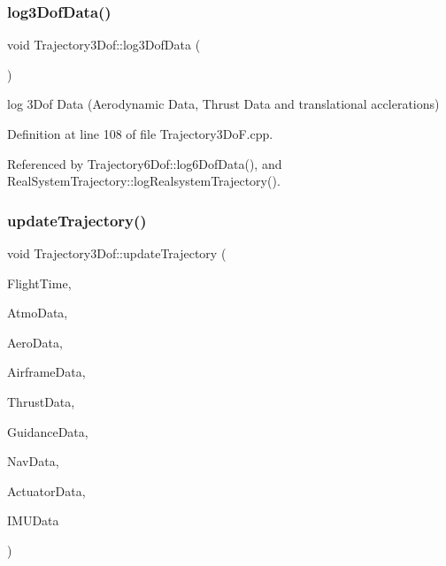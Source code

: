 \mbox{\label{class_trajectory3_dof_a0ec1ae76ec1d60f03aaef9107b749cd0}} 
\subsubsection{\texorpdfstring{log3\+Dof\+Data()}{log3DofData()}}
{\footnotesize\ttfamily void Trajectory3\+Dof\+::log3\+Dof\+Data (\begin{DoxyParamCaption}{ }\end{DoxyParamCaption})}



log 3\+Dof Data (Aerodynamic Data, Thrust Data and translational acclerations) 



Definition at line 108 of file Trajectory3\+Do\+F.\+cpp.



Referenced by Trajectory6\+Dof\+::log6\+Dof\+Data(), and Real\+System\+Trajectory\+::log\+Realsystem\+Trajectory().

\mbox{\label{class_trajectory3_dof_a286d578ad75beaf1018350167557a457}} 
\subsubsection{\texorpdfstring{update\+Trajectory()}{updateTrajectory()}}
{\footnotesize\ttfamily void Trajectory3\+Dof\+::update\+Trajectory (\begin{DoxyParamCaption}\item[{\hyperlink{group___tools_ga3f1431cb9f76da10f59246d1d743dc2c}{Float64}}]{Flight\+Time,  }\item[{Atmosphere\+Struct \&}]{Atmo\+Data,  }\item[{Aerodynamic\+Struct \&}]{Aero\+Data,  }\item[{Airframe\+Struct \&}]{Airframe\+Data,  }\item[{Thrust\+Struct \&}]{Thrust\+Data,  }\item[{Guidance\+Struct \&}]{Guidance\+Data,  }\item[{Navigation\+Struct \&}]{Nav\+Data,  }\item[{Actuator\+Struct \&}]{Actuator\+Data,  }\item[{I\+M\+U\+Struct \&}]{I\+M\+U\+Data }\end{DoxyParamCaption})\hspace{0.3cm}{\ttfamily [virtual]}}



